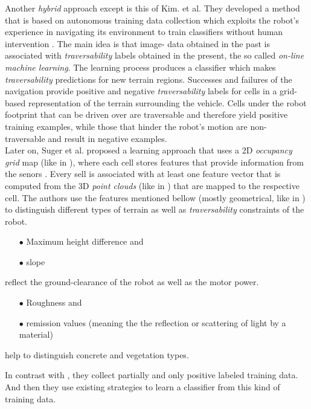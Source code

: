 \documentclass[12pt,a4paper]{report}
\newcommand{\term}{\textit}
\newcommand{\acronym}{\MakeUppercase}
\begin{document}
	Another \term{hybrid} approach except \cite{Shneier} is this of Kim. et al. They 
	developed a method that is based on autonomous training data collection which 
	exploits the robot’s experience in navigating its environment to train 
	classifiers without human intervention \cite{Kim}. The main idea is that image-
	data obtained in the past is associated with \term{traversability} labels 
	obtained in the present, the so called \term{on-line machine learning}. The 
	learning process produces a classifier which makes \term{traversability} 
	predictions for new terrain regions. Successes and failures of the navigation 
	provide positive and negative \term{traversability} labels for cells in a grid-
	based representation of the terrain surrounding the vehicle. Cells under the 
	robot footprint that can be driven over are traversable and therefore yield 
	positive training examples, while those that hinder the robot’s motion are non-
	traversable and result in negative examples.
	\\
	
	Later on, Suger et al. proposed a learning approach that uses a \acronym{2d} 
	\term{occupancy grid} map (like in \cite{Shneier}), where each cell stores 
	features that provide information from the senors \cite{Suger}. Every sell is 
	associated with at least one feature vector that is computed from the \acronym{3d} 
	\term{point clouds} (like in \cite{Lalonde}) that are mapped to the respective 
	cell. The authors use the features mentioned bellow (mostly geometrical, like in 
	\cite{Lalonde, Pfaff}) to distinguish different types of terrain as well as 
	\term{traversability} constraints of the robot. 
	\begin{enumerate}
		\item[$\bullet$] Maximum height difference and
		\item[$\bullet$] slope 
	\end{enumerate}
	reflect the ground-clearance of the robot as well as the motor power.
	\begin{enumerate}
		\item[$\bullet$] Roughness and
		\item[$\bullet$] remission values (meaning the the reflection or scattering 
		of light by a material) 
	\end{enumerate}
	help to distinguish concrete and vegetation types.
	\par
	In contrast with \cite{Kim}, they collect partially and only positive labeled 
	training data. And then they use existing strategies \cite{Denis, Elkan} to 
	learn a classifier from this kind of training data.
	\\
	
\end{document}
